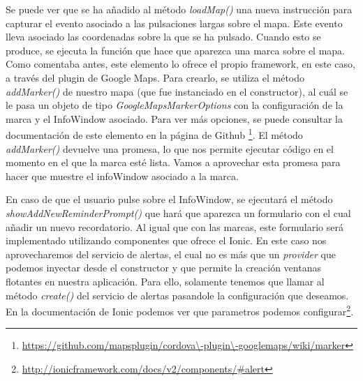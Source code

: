 Se puede ver que se ha añadido al método \emph{loadMap()} una nueva instrucción para capturar el evento asociado a las pulsaciones largas sobre el mapa. Este evento lleva asociado las coordenadas sobre la que se ha pulsado. Cuando esto se produce, se ejecuta la función que hace que aparezca una marca sobre el mapa. Como comentaba antes, este elemento lo ofrece el propio framework, en este caso, a través del plugin de Google Maps. Para crearlo, se utiliza el método \emph{addMarker()} de nuestro mapa (que fue instanciado en el constructor), al cuál se le pasa un objeto de tipo \emph{GoogleMapsMarkerOptions} con la configuración de la marca y el InfoWindow asociado. Para ver más opciones, se puede consultar la documentación de este elemento en la página de Github \footnote{\url{https://github.com/mapsplugin/cordova\-plugin\-googlemaps/wiki/marker}}. El método \emph{addMarker()} devuelve una promesa, lo que nos permite ejecutar código en el momento en el que la marca esté lista. Vamos a aprovechar esta promesa para hacer que muestre el infoWindow asociado a la marca.

En caso de que el usuario pulse sobre el InfoWindow, se ejecutará el método \emph{showAddNewReminderPrompt()} que hará que aparezca un formulario con el cual añadir un nuevo recordatorio. Al igual que con las marcas, este formulario será implementado utilizando componentes que ofrece el Ionic. En este caso nos aprovecharemos del servicio de alertas, el cual no es más que un \emph{provider} que podemos inyectar desde el constructor y que permite la creación ventanas flotantes en nuestra aplicación. Para ello, solamente tenemos que llamar al método \emph{create()} del servicio de alertas pasandole la configuración que deseamos. En la documentación de Ionic podemos ver que parametros podemos configurar\footnote{\url{http://ionicframework.com/docs/v2/components/\#alert}}.


